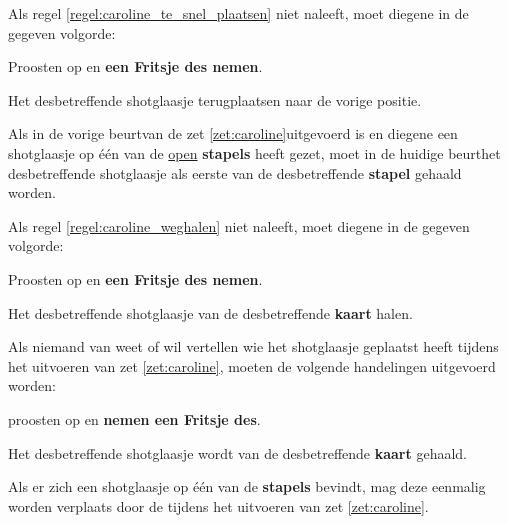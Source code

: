 \vervolgLijst{}
\item Als \eenSpeler regel \ref{regel:caroline_te_snel_plaatsen} niet naleeft, moet diegene in de gegeven volgorde:
\puntLijst{}
\item Proosten op  en \textbf{een Fritsje des nemen}\footnotemark[2].
\item Het desbetreffende shotglaasje terugplaatsen naar de vorige positie.
\eindPuntLijst{}
\eindLijst{}


\vervolgLijst{}
\item \label{regel:caroline_weghalen} Als in de vorige beurt\footnotemark[3] van de \huidigeSpeler zet \ref{zet:caroline}\footnotemark[1] uitgevoerd is en diegene een shotglaasje op \'e\'en van de \ul{open} \textbf{stapels} heeft gezet, moet in de huidige beurt\footnotemark[3] het desbetreffende shotglaasje als eerste van de desbetreffende \textbf{stapel} gehaald worden.
\eindLijst{}

\vervolgLijst{}
\item Als \eenSpeler regel \ref{regel:caroline_weghalen} niet naleeft, moet diegene in de gegeven volgorde:
\puntLijst{}
\item Proosten op  en \textbf{een Fritsje des nemen}\footnotemark[2].
\item Het desbetreffende shotglaasje van de desbetreffende \textbf{kaart} halen.
\eindPuntLijst{}
\eindLijst{}

\vervolgLijst{}
\item Als niemand van \alleSpelers weet of wil vertellen wie het shotglaasje geplaatst heeft tijdens het uitvoeren van zet \ref{zet:caroline}\footnotemark[1], moeten de volgende handelingen uitgevoerd worden:
\puntLijst{}
\item \AlleSpelers proosten op  en \textbf{nemen een Fritsje des}\footnotemark[2].
\item Het desbetreffende shotglaasje wordt van de desbetreffende \textbf{kaart} gehaald.
\eindPuntLijst{}
\eindLijst{}


\vervolgLijst{}
\item \label{regel:shotglaasje_aanraken_1} Als er zich een shotglaasje op \'e\'en van de \textbf{stapels} bevindt, mag deze eenmalig worden verplaats door de \huidigeSpeler tijdens het uitvoeren van zet \ref{zet:caroline}\footnotemark[1].
\eindLijst{}

